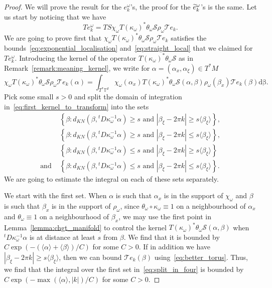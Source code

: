 \documentclass[10pt]{amsart}
\theoremstyle{definition}\newtheorem{defi}[theo]{Definition}\newtheorem{rema}[theo]{Remark}\newtheorem{exam}[theo]{Example}\newtheorem{exem}[theo]{Example}\newtheorem{nota}[theo]{Notation}
\newcommand{\set}[1]{\left\{ #1 \right\}}
\newcommand{\brac}[1]{\langle #1 \rangle}
\newcommand{\clT}{\mathcal{T}}
\newcommand{\clS}{\mathcal{S}}
\newcommand{\bbT}{\mathbb{T}}
\newcommand{\rmd}{\mathrm{d}}
\let\oldtilde\tilde
\renewcommand*{\tilde}[1]{\mathchoice{\widetilde{#1}}{\widetilde{#1}}{\oldtilde{#1}}{\oldtilde{#1}}}
\begin{document}
\begin{proof}
We will prove the result for the $e_k^\omega$'s, the proof for the $\tilde{e}_k^\omega$'s is the same. Let us start by noticing that we have
\begin{equation}\label{eq:transform_ekomega}
T e_k^\omega = TS \chi_\omega T(\kappa_\omega)^* \theta_\omega \clS \rho_\omega \clT e_k.
\end{equation}
We are going to prove first that $\chi_\omega T(\kappa_\omega)^* \theta_\omega \clS \rho_\omega \clT e_k$ satisfies the bounds~\eqref{eq:exponential_localisation} and~\eqref{eq:straight_local} that we claimed for $T e_k^\omega$. Introducing the kernel of the operator $T(\kappa_\omega)^* \theta_\omega \clS$ as in Remark~\ref{remark:meaning_kernel}, we write for $\alpha = (\alpha_x,\alpha_\xi) \in T^* M$
\begin{equation}\label{eq:first_kernel_to_transform}
\chi_\omega T(\kappa_\omega)^* \theta_\omega \clS \rho_\omega \clT e_k(\alpha) = \int_{T^* \bbT^d} \chi_\omega(\alpha_x) T(\kappa_\omega)^* \theta_\omega \clS(\alpha,\beta) \rho_\omega(\beta_x) \clT e_k(\beta) \rmd \mathrm{\beta}.
\end{equation}
Pick some small $s > 0$ and split the domain of integration in~\eqref{eq:first_kernel_to_transform} into the sets
\begin{equation}\label{eq:split_in_four}
\begin{split}
& \set{\beta: d_{KN}\left(\beta,{}^t D \kappa_\omega^{-1} \alpha\right) \geq s \text{ and } |\beta_\xi - 2 \pi k| \geq s \brac{\beta_\xi}},\\
& \set{\beta: d_{KN}\left(\beta,{}^t D \kappa_\omega^{-1} \alpha\right) \geq s \text{ and } |\beta_\xi - 2 \pi k| \leq s \brac{\beta_\xi}}, \\ &
\set{\beta: d_{KN}\left(\beta,{}^t D \kappa_\omega^{-1} \alpha\right) \leq s \text{ and } |\beta_\xi - 2 \pi k| \geq s \brac{\beta_\xi}} \\ \text{and }
&\set{\beta: d_{KN}\left(\beta,{}^t D \kappa_\omega^{-1} \alpha\right) \leq s \text{ and } |\beta_\xi - 2 \pi k| \leq s \brac{\beta_\xi}}.
\end{split}
\end{equation}
We are going to estimate the integral on each of these sets separately.

We start with the first set. When $\alpha$ is such that $\alpha_x$ is in the support of $\chi_\omega$ and $\beta$ is such that $\beta_x$ is in the support of $\rho_\omega$, since $\theta_\omega \circ \kappa_\omega \equiv 1$ on a neighbourhood of $\alpha_x$ and $\theta_\omega \equiv 1$ on a neighbourhood of $\beta_x$, we may use the first point in Lemma~\ref{lemma:chgt_manifold} to control the kernel $T(\kappa_\omega)^* \theta_\omega \clS(\alpha,\beta)$ when ${}^t D \kappa_\omega^{-1} \alpha$ is at distance at least $s$ from $\beta$. We find that it is bounded by $C\exp(- (\brac{\alpha} + \brac{\beta})/C)$ for some $C > 0$. If in addition we have $|\beta_\xi - 2 \pi k| \geq s \brac{\beta_\xi}$, then we can bound $\clT e_k(\beta)$ using~\eqref{eq:better_torus}. Thus, we find that the integral over the first set in~\eqref{eq:split_in_four} is bounded by $C \exp(- \max(\brac{\alpha},|k|)/C)$ for some $C > 0$.


\end{proof}
\end{document}
